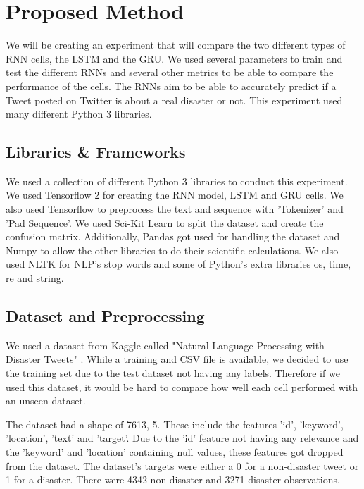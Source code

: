 \documentclass[a4paper,10pt]{article}
\begin{document}
\section{Proposed Method}
	We will be creating an experiment that will compare the two different types of RNN cells, the LSTM and the GRU. We used several parameters to train and test the different RNNs and several other metrics to be able to compare the performance of the cells. The RNNs aim to be able to accurately predict if a Tweet posted on Twitter is about a real disaster or not. This experiment used many different Python 3 libraries.

\subsection{Libraries \& Frameworks}
	We used a collection of different Python 3 libraries to conduct this experiment. We used Tensorflow 2 \cite{tensorflow} for creating the RNN model, LSTM and GRU cells. We also used Tensorflow to preprocess the text and sequence with 'Tokenizer' and 'Pad Sequence'. We used Sci-Kit Learn \cite{scikit-learn} to split the dataset and create the confusion matrix. Additionally, Pandas \cite{mckinney-proc-scipy-2010} got used for handling the dataset and Numpy to allow the other libraries to do their scientific calculations. We also used NLTK \cite{Loper02nltk:the} for NLP's stop words and some of Python's extra libraries os, time, re and string. 

\subsection{Dataset and Preprocessing}
	We used a dataset from Kaggle called "Natural Language Processing with Disaster Tweets" \cite{disater_kaggle}. While a training and CSV file is available, we decided to use the training set due to the test dataset not having any labels. Therefore if we used this dataset, it would be hard to compare how well each cell performed with an unseen dataset.
	
	The dataset had a shape of 7613, 5. These include the features 'id', 'keyword', 'location', 'text' and 'target'. Due to the 'id' feature not having any relevance and the 'keyword' and 'location' containing null values, these features got dropped from the dataset. The dataset's targets were either a 0 for a non-disaster tweet or 1 for a disaster. There were 4342 non-disaster and 3271 disaster observations.
	
\end{document}

